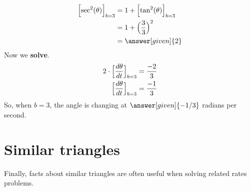 \documentclass{ximera}
\begin{document}
\begin{example}
\begin{explanation}
    \begin{align*}
     \Bigl[\sec^2(\theta)\Bigr]_{b=3} &= 1+ \Bigl[\tan^2(\theta)\Bigr]_{b=3}\\
      &= 1+\Bigl(\frac{3}{3}\Bigr)^2\\
      &= \answer[given]{2}
    \end{align*}
   Now we \textbf{solve}.
    \begin{align*}
      2\cdot \Bigl[\dfrac{d\theta}{dt}\Bigr]_{b=3}  &= \frac{-2}{3}\\
     \Bigl[\dfrac{d\theta}{dt}\Bigr]_{b=3} &= \frac{-1}{3}
    \end{align*}
    So, when $b=3$, the angle is changing at $\answer[given]{-1/3}$
    radians per second.
  \end{explanation}
\end{example}



\section{Similar triangles}

Finally, facts about similar triangles are often useful when solving
related rates problems.
\end{document}

